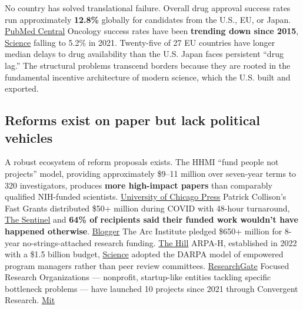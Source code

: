 No country has solved translational failure. Overall drug approval success rates run approximately \textbf{12.8\%} globally for candidates from the U.S., EU, or Japan. \href{https://pmc.ncbi.nlm.nih.gov/articles/PMC6409418/}{PubMed Central} Oncology success rates have been \textbf{trending down since 2015}, \href{https://www.science.org/content/blog-post/latest-drug-failure-and-approval-rates}{Science} falling to 5.2\% in 2021. Twenty-five of 27 EU countries have longer median delays to drug availability than the U.S. Japan faces persistent ``drug lag.'' The structural problems transcend borders because they are rooted in the fundamental incentive architecture of modern science, which the U.S. built and exported.

\subsection{Reforms exist on paper but lack political vehicles}\label{19_200_billion-reforms-exist-on-paper-but-lack-political-vehicles}

A robust ecosystem of reform proposals exists. The HHMI ``fund people not projects'' model, providing approximately \$9--11 million over seven-year terms to 320 investigators, produces \textbf{more high-impact papers} than comparably qualified NIH-funded scientists. \href{https://www.journals.uchicago.edu/doi/full/10.1086/699933}{University of Chicago Press} Patrick Collison's Fast Grants distributed \$50+ million during COVID with 48-hour turnaround, \href{https://www.lewistownsentinel.com/news/business/2023/07/grants-from-tech-billionaire-to-speed-up-science-research/}{The Sentinel} and \textbf{64\% of recipients said their funded work wouldn't have happened otherwise}. \href{https://johnhcochrane.blogspot.com/2021/06/fast-grants-and-economics-of.html}{Blogger} The Arc Institute pledged \$650+ million for 8-year no-strings-attached research funding. \href{https://thehill.com/homenews/ap/ap-business/ap-quick-grants-from-tech-billionaires-aim-to-speed-up-science-research-but-not-all-scientists-approve/}{The Hill} ARPA-H, established in 2022 with a \$1.5 billion budget, \href{https://www.science.org/content/article/final-nih-budget-2024-essentially-flat}{Science} adopted the DARPA model of empowered program managers rather than peer review committees. \href{https://www.researchgate.net/publication/337776171_15_Does_NIH_need_a_DARPA}{ResearchGate} Focused Research Organizations --- nonprofit, startup-like entities tackling specific bottleneck problems --- have launched 10 projects since 2021 through Convergent Research. \href{https://bcs.mit.edu/news/former-mit-researchers-advance-new-model-innovation}{Mit}

